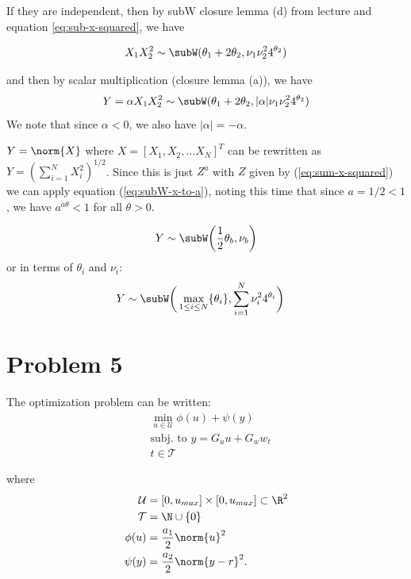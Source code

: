 \documentclass{homework}
\begin{document}
\begin{letterenum}
If they are independent, then by subW closure lemma (d) from lecture and equation \ref{eq:sub-x-squared},  we have

\begin{equation*}
    X_1X_2^2 \sim \subW (\theta_1 + 2 \theta_2, \nu_1 \nu_2^2 4^{\theta_2})
\end{equation*}

and then by scalar multiplication (closure lemma (a)), we have
\begin{equation*}
    Y = \alpha X_1X_2^2 \sim \subW (\theta_1 + 2\theta_2, |\alpha| \nu_1 \nu_2^2 4^{\theta_2})
\end{equation*}
We note that since $\alpha < 0$, we also have $|\alpha| = -\alpha$.

\item $Y = \norm{X}$ where $X = [X_1, X_2, \dots X_N]^T$ can be rewritten as $Y = (\sum_{i=1}^N X_i^2)^{1/2}$.
Since this is just $Z^a$ with $Z$ given by (\ref{eq:sum-x-squared}) we can apply equation (\ref{eq:subW-x-to-a}),
noting this time that since $a = 1/2 < 1$, we have $a^{a\theta} < 1$ for all $\theta > 0$.

\begin{equation*}
    Y \sim \subW \biggl(
        \frac{1}{2} \theta_b,
        \nu_b 
    \biggr)
\end{equation*}
or in terms of $\theta_i$ and $\nu_i$:
\begin{align*}
    Y \sim \subW \biggl(&\max_{1 \leq i \leq N} \{\theta_i\},
        \sum_{i=1}^{N} \nu_i^2 4^{\theta_i}
    \biggr)
\end{align*}
\end{letterenum}

\section{Problem 5}

The optimization problem can be written:
\begin{align*}
    &\min_{u \in \mathcal{U}} \phi(u) + \psi(y) \\
    &\text{subj. to } y = G_u u + G_w w_t \\
    &t \in \mathcal{T}
\end{align*}

where
\begin{align*}
    \mathcal{U} &= [0, u_{max}] \times [0, u_{max}] \subset \R^2 \\
    \mathcal{T} &= \N \cup \{0\} \\
    \phi(u) &= \frac{a_1}{2} \norm{u}^2 \\
    \psi(y) &= \frac{a_2}{2} \norm{y - r}^2.
\end{align*}
\end{document}
